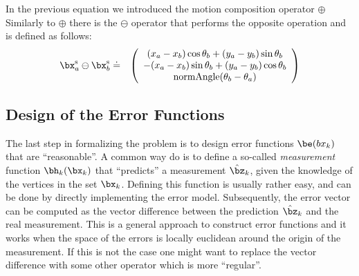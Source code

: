 \documentclass[a4paper]{article}
\begin{document}
In  the previous equation we introduced the motion composition operator $\oplus$
Similarly to $\oplus$ there is the $\ominus$ operator that performs the opposite operation
and is defined as follows:
\begin{eqnarray}
    \bx^\mathrm{s}_a \ominus \bx^\mathrm{s}_b   & \doteq & 
    \left( 
    \begin{array}{c}
        (x_a - x_b)  \cos \theta_b + (y_a - y_b) \sin \theta_b \\
      - (x_a - x_b)  \sin \theta_b + (y_a - y_b) \cos \theta_b \\
      \mathrm{normAngle}(\theta_b - \theta_a)
    \end{array}
    \right)
\end{eqnarray}

\subsection{Design of the Error Functions}
The last step in formalizing the problem is to design error functions
$\be(bx_k)$ that are ``reasonable''. A common way do is to define a
so-called \emph{measurement} function $\bh_k(\bx_k)$ that ``predicts''
a measurement $\hat \bz_k$, given the knowledge of the vertices in the
set $\bx_k$. Defining this function is usually rather easy, and can be
done by directly implementing the error model. Subsequently, the error
vector can be computed as the vector difference between the prediction
$\hat \bz_k$ and the real measurement.  This is a general approach to
construct error functions and it works when the space of the errors is
locally euclidean around the origin of the measurement. If this is not
the case one might want to replace the vector difference with some
other operator which is more ``regular''.
\end{document}
